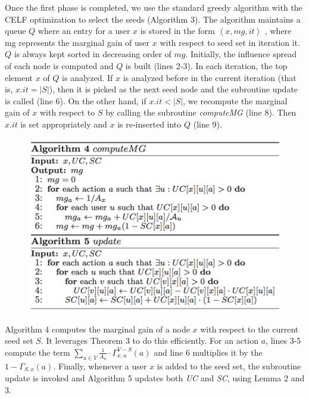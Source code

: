 \documentclass{acm_proc_article-sp}
\begin{document}
Once the first phase is completed, we use the standard greedy algorithm with the CELF optimization \cite{leskovec2007cost} to select the seeds (Algorithm 3). The algorithm maintains a queue $Q$ where an entry for a user $x$ is stored in the form $\left\langle x, mg, it\right\rangle$ , where mg represents the marginal gain of user $x$ with respect to seed set in iteration it. $Q$ is always kept sorted in decreasing order of $mg$. Initially, the influence spread of each node is computed and $Q$ is built (lines 2-3). In each iteration, the top element $x$ of $Q$ is analyzed. If $x$ is analyzed before in the current iteration (that is, $x.it = |S|$), then it is picked as the next seed node and the subroutine update is called (line 6). On the other hand, if $x.it < |S|$, we recompute the marginal gain of $x$ with respect to $S$ by calling the subroutine \textit{computeMG} (line 8). Then $x.it$ is set appropriately and $x$ is re-inserted into $Q$ (line 9).
\begin{figure}
	\includegraphics[scale=0.5]{al45.png}
	\centering
	\label{al45}
\end{figure}

Algorithm 4 computes the marginal gain of a node $x$ with respect to the current seed set $S$. It leverages Theorem 3 to do this efficiently. For an action $a$, lines 3-5 compute the term   $\sum_{u \in V} \frac{1}{A_u} \cdot \Gamma_{x,u}^{V-S}(a)$ and line 6 multiplies it by the $1-\Gamma_{S,x}(a)$. Finally, whenever a user $x$ is added to the seed set, the subroutine update is invoked and Algorithm 5 updates both \textit{UC} and \textit{SC}, using Lemma 2 and 3.
\end{document}
